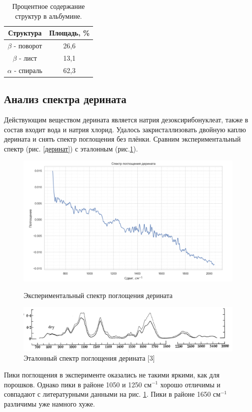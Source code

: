 \documentclass{article}
\begin{document}
\begin{table}[h!]
\begin{center}
\caption{\label{tab:canonsummary} Процентное содержание структур в альбумине.}
\begin{tabular}{|c | c |} 
 \hline
 Структура & Площадь, \%   \\ [0.5ex] 
 \hline
 $\beta$ - поворот & 26,6  \\ 
 \hline
 $\beta$ - лист & 13,1  \\
 \hline
 $\alpha$ - спираль & 62,3   \\ [1ex] 
 \hline
\end{tabular}
\end{center}
\end{table}
\newpage
\subsection{Анализ спектра дерината}\;
\par Действующим веществом дерината является натрия дезоксирибонуклеат, также в состав входит вода и натрия хлорид. Удалось закристаллизовать двойную каплю дерината и снять спектр поглощения без плёнки. Сравним экспериментальный спектр (рис. \ref{деринат}) с эталонным (рис.\ref{эталон}).
\begin{figure}[h!] 
        \centering
        \centering
            \includegraphics[width=0.9\linewidth]{Images/деринат.png}
                 \caption{Экспериментальный спектр поглощения дерината}
                 \label{деринат}
        \endminipage\hfill
        \centering
             \includegraphics[width=0.9\linewidth]{Images/derinat.png}
                 \caption{Эталонный спектр поглощения дерината [3]}
                 \label{эталон}
        \endminipage
\end{figure}
\par Пики поглощения в эксперименте оказались не такими яркими, как для порошков. Однако пики в районе 1050 и 1250 $см^{-1}$ хорошо отличимы и совпадают с литературными данными на рис. \ref{эталон}. Пики в районе 1650 $см^{-1}$ различимы уже намного хуже.
\newpage
\end{document}
